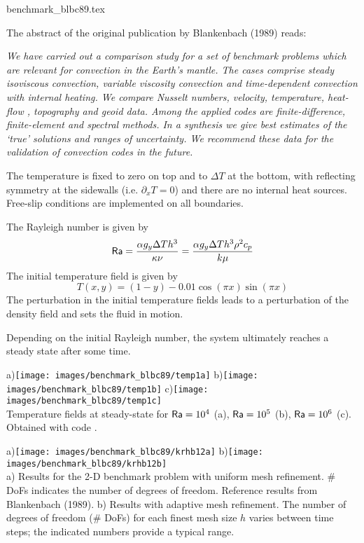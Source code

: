 \begin{flushright} {\tiny {\color{gray} benchmark\_blbc89.tex}} \end{flushright}

The abstract of the original publication by Blankenbach \etal (1989) \cite{blbc89} reads:
\begin{center}
{\it 
We have carried out a comparison study for a set of benchmark problems 
which are relevant for convection in the Earth's mantle. The cases comprise 
steady isoviscous convection, variable viscosity convection and time-dependent 
convection with internal heating. We compare Nusselt numbers, velocity, 
temperature, heat-flow , topography and geoid data. Among the applied codes 
are finite-difference, finite-element and spectral methods. In a synthesis 
we give best estimates of the `true' solutions and ranges of uncertainty. We
recommend these data for the validation of convection codes in the future.
}
\end{center}

The temperature is fixed to zero on top and to $\Delta T$ at the bottom, 
with reflecting symmetry at the sidewalls (i.e. $\partial_x T=0$) 
and there are no internal heat sources. 
Free-slip conditions are implemented on all boundaries. 

The Rayleigh number is given by
\[
{\mathsf{Ra}} = \frac{\alpha g_y \Delta T h^3 }{\kappa \nu}
=\frac{\alpha g_y \Delta T h^3 \rho^2 c_p}{k \mu}
\]
The initial temperature field is given by 
\[
T(x,y)=(1-y) - 0.01\cos(\pi x) \sin(\pi x)
\]
The perturbation in the initial temperature fields leads to 
a perturbation of the density field and sets the fluid in motion. 

Depending on the initial Rayleigh number, the system ultimately reaches a 
steady state after some time. 

\begin{center}
a)\texttt{[image: images/benchmark\_blbc89/temp1a]}
b)\texttt{[image: images/benchmark\_blbc89/temp1b]}
c)\texttt{[image: images/benchmark\_blbc89/temp1c]}\\
{\captionfont Temperature fields at steady-state for 
${\mathsf{Ra}}=10^4$ (a), ${\mathsf{Ra}}=10^5$ (b), ${\mathsf{Ra}}=10^6$ (c).
Obtained with \elefant code \cite{thie14}.}
\end{center}


\begin{center}
a)\texttt{[image: images/benchmark\_blbc89/krhb12a]}
b)\texttt{[image: images/benchmark\_blbc89/krhb12b]}\\
{\captionfont 
a) Results for the 2-D benchmark problem with uniform mesh refinement. 
\# DoFs indicates the number of degrees of freedom.
Reference results from Blankenbach \etal (1989).
b) Results with adaptive mesh refinement. The number of degrees of freedom (\# DoFs) for
each finest mesh size $h$ varies between time steps; 
the indicated numbers provide a typical range.}
\end{center}


